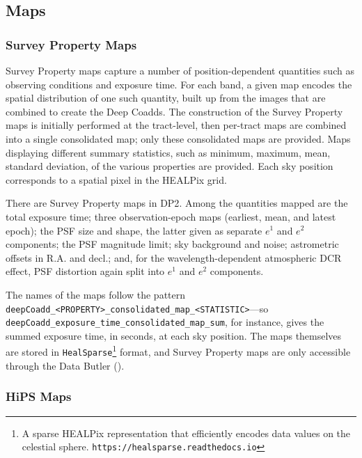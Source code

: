 
\subsection{Maps}
\subsubsection{Survey Property Maps}
\label{sssec:propertymaps}
Survey Property maps capture a number of position-dependent quantities such as observing conditions and exposure time.
For each band, a given map encodes the spatial distribution of one such quantity, built up from the images that are combined to create the Deep Coadds.
The construction of the Survey Property maps is initially performed at the \gls{tract}-level, then per-tract maps are combined into a single consolidated map; only these consolidated maps are provided.
Maps displaying different summary statistics, such as minimum, maximum, mean, standard deviation, of the various properties are provided.
Each sky position corresponds to a spatial pixel in the \gls{HEALPix}\citep[][]{2005ApJ...622..759G} grid.

There are \nsurveypropertymaps Survey Property maps in \gls{DP2}.
Among the quantities mapped are the total exposure time; three observation-epoch maps (earliest, mean, and latest \gls{epoch}); the \gls{PSF} size and \gls{shape}, the latter given as separate $e^1$ and $e^2$ components; the PSF magnitude limit; sky background and noise; astrometric offsets in R.A. and decl.; and, for the wavelength-dependent atmospheric \gls{DCR} effect, PSF distortion again split into $e^1$ and $e^2$ components.

The names of the maps follow the pattern \texttt{deepCoadd\_<PROPERTY>\_consolidated\_map\_<STATISTIC>}—so \texttt{deepCoadd\_exposure\_time\_consolidated\_map\_sum}, for instance, gives the summed exposure time, in seconds, at each sky position.
The maps themselves are stored in \texttt{HealSparse}\footnote{A sparse \gls{HEALPix} representation that efficiently encodes data values on the celestial sphere. \nolinkurl{https://healsparse.readthedocs.io}} format, and Survey Property maps are only accessible through the Data \gls{Butler} ().

\subsubsection{HiPS Maps}

